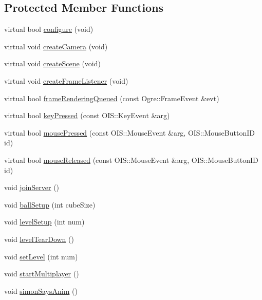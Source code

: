 \subsection*{Protected Member Functions}
\begin{DoxyCompactItemize}
\item 
virtual bool \hyperlink{classTileGame_a460265525565530c2d5d448a4f10cce1}{configure} (void)
\item 
virtual void \hyperlink{classTileGame_af68126fe7750735a9d3850f11cf93354}{create\-Camera} (void)
\item 
virtual void \hyperlink{classTileGame_a7a58cee3d3b0f06d80da0b06bae68347}{create\-Scene} (void)
\item 
virtual void \hyperlink{classTileGame_a8e62f0508c93131c11ed08e0adbedfbb}{create\-Frame\-Listener} (void)
\item 
virtual bool \hyperlink{classTileGame_abfa3b829a661de02f3f4bf2d8102bd49}{frame\-Rendering\-Queued} (const Ogre\-::\-Frame\-Event \&evt)
\item 
virtual bool \hyperlink{classTileGame_af96355c8ea5a968b5ceb5090ea4e811e}{key\-Pressed} (const O\-I\-S\-::\-Key\-Event \&arg)
\item 
virtual bool \hyperlink{classTileGame_a1826b5a7db94eb11037a46c5d57dfc4f}{mouse\-Pressed} (const O\-I\-S\-::\-Mouse\-Event \&arg, O\-I\-S\-::\-Mouse\-Button\-I\-D id)
\item 
virtual bool \hyperlink{classTileGame_ab7a0cbe5c9d1f41fa3b16486437511e4}{mouse\-Released} (const O\-I\-S\-::\-Mouse\-Event \&arg, O\-I\-S\-::\-Mouse\-Button\-I\-D id)
\item 
void \hyperlink{classTileGame_a529758a31f24d19ab735fc6955511f5a}{join\-Server} ()
\item 
void \hyperlink{classTileGame_a512ac0031cfe85e79ca0a53582492240}{ball\-Setup} (int cube\-Size)
\item 
void \hyperlink{classTileGame_a1da6c5e8d396ebdfe05c2eedf28a2ca8}{level\-Setup} (int num)
\item 
void \hyperlink{classTileGame_a55045a99dda1545c4043ab6da75d2432}{level\-Tear\-Down} ()
\item 
void \hyperlink{classTileGame_ab59731a2c682beeda91ad1a89229a3f0}{set\-Level} (int num)
\item 
void \hyperlink{classTileGame_a1ee23b22f33fa11b9bb4854d16d19653}{start\-Multiplayer} ()
\item 
void \hyperlink{classTileGame_aabd8c2eb7913022c30119846d57eaba5}{simon\-Says\-Anim} ()
\end{DoxyCompactItemize}
